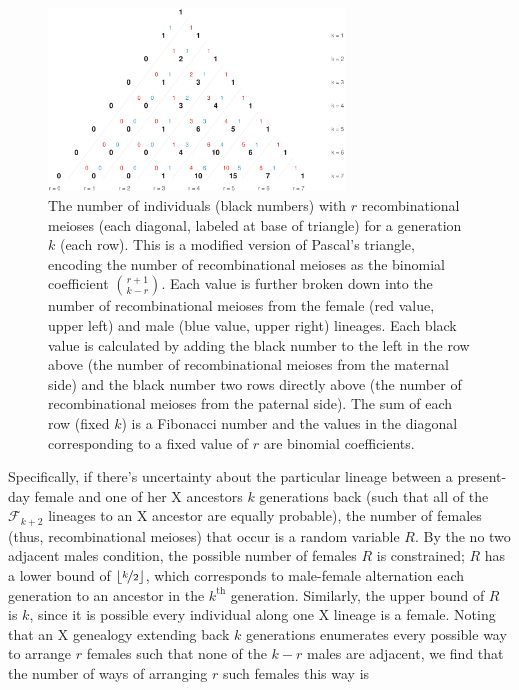 \documentclass[11pt]{article}
\begin{document}
\begin{figure}[!ht]
  \centering
  \includegraphics[width=0.7\textwidth]{images/bifib}

  \caption{The number of individuals (black numbers) with $r$ recombinational
    meioses (each diagonal, labeled at base of triangle) for a generation $k$
    (each row). This is a modified version of Pascal's triangle, encoding the
    number of recombinational meioses as the binomial coefficient ${r + 1
    \choose k - r}$.  Each value is further broken down into the number of
    recombinational meioses from the female (red value, upper left) and male
    (blue value, upper right) lineages. Each black value is calculated by adding
    the black number to the left in the row above (the number of
    recombinational meioses from the maternal side) and the black number two
    rows directly above (the number of recombinational meioses from the
  paternal side). The sum of each row (fixed $k$) is a Fibonacci number and the
values in the diagonal corresponding to a fixed value of $r$ are binomial
coefficients.}

  \label{fig:pascals-bifib}

\end{figure}

Specifically, if there's uncertainty about the particular lineage between a
present-day female and one of her X ancestors $k$ generations back (such that
all of the $\mathcal{F}_{k+2}$ lineages to an X ancestor are equally probable),
the number of females (thus, recombinational meioses) that occur is a random
variable $R$. By the no two adjacent males condition, the possible number of
females $R$ is constrained; $R$ has a lower bound of $\lfloor \nicefrac{k}{2}
\rfloor$, which corresponds to male-female alternation each generation to an
ancestor in the $k^\text{th}$ generation. Similarly, the upper bound of $R$ is
$k$, since it is possible every individual along one X lineage is a female.
Noting that an X genealogy extending back $k$ generations enumerates every
possible way to arrange $r$ females such that none of the $k-r$ males are
adjacent, we find that the number of ways of arranging $r$ such females this
way is
\end{document}
